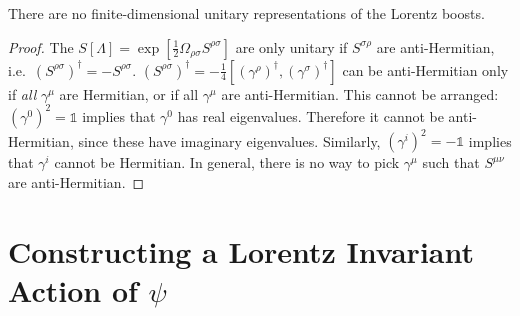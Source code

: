 \begin{claim}
  There are no finite-dimensional unitary representations of the Lorentz boosts.
\end{claim}
\begin{proof}
  The $S[\Lambda] = \exp[\frac{1}{2} \Omega_{\rho\sigma} S^{\rho\sigma}]$ are only unitary if $S^{\sigma\rho}$ are anti-Hermitian, i.e.~$(S^{\rho\sigma})^{\dagger} = -S^{\rho\sigma}$. $(S^{\rho\sigma})^{\dagger} = -\frac{1}{4} [(\gamma^{\rho})^{\dagger}, (\gamma^{\sigma})^{\dagger}]$ can be anti-Hermitian only if \emph{all} $\gamma^{\mu}$ are Hermitian, or if all $\gamma^{\mu}$ are anti-Hermitian.
  This cannot be arranged: $(\gamma^0)^2 = \mathbb{1}$ implies that $\gamma^0$ has real eigenvalues. Therefore it cannot be anti-Hermitian, since these have imaginary eigenvalues.
  Similarly, $(\gamma^i)^2 = -\mathbb{1}$ implies that $\gamma^i$ cannot be Hermitian.
  In general, there is no way to pick $\gamma^{\mu}$ such that $S^{\mu\nu}$ are anti-Hermitian.
\end{proof}

\section{Constructing a Lorentz Invariant Action of \texorpdfstring{$\psi$}{psi}}%
\label{sec:constructing_a_lorentz_invariant_action_of_psi_}

